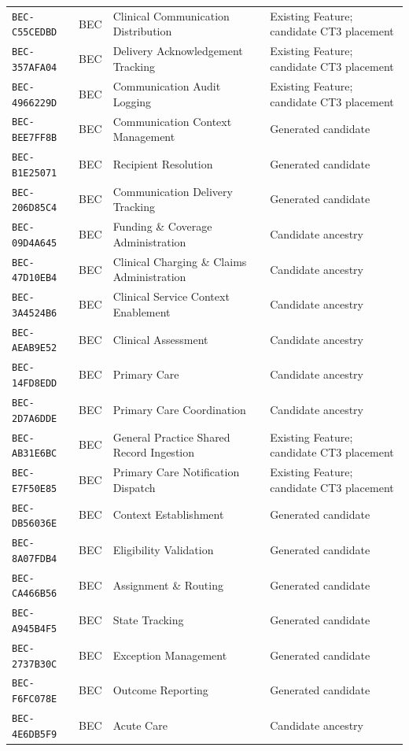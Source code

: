 \documentclass[11pt,a4paper,openany]{book}
\begin{document}
\begin{longtable}{@{}p{.19\linewidth}p{.12\linewidth}p{.39\linewidth}p{.24\linewidth}@{}}
\texttt{BEC-C55CEDBD} & BEC & Clinical Communication Distribution & Existing Feature; candidate CT3 placement \\
\texttt{BEC-357AFA04} & BEC & Delivery Acknowledgement Tracking & Existing Feature; candidate CT3 placement \\
\texttt{BEC-4966229D} & BEC & Communication Audit Logging & Existing Feature; candidate CT3 placement \\
\texttt{BEC-BEE7FF8B} & BEC & Communication Context Management & Generated candidate \\
\texttt{BEC-B1E25071} & BEC & Recipient Resolution & Generated candidate \\
\texttt{BEC-206D85C4} & BEC & Communication Delivery Tracking & Generated candidate \\
\texttt{BEC-09D4A645} & BEC & Funding \& Coverage Administration & Candidate ancestry \\
\texttt{BEC-47D10EB4} & BEC & Clinical Charging \& Claims Administration & Candidate ancestry \\
\texttt{BEC-3A4524B6} & BEC & Clinical Service Context Enablement & Candidate ancestry \\
\texttt{BEC-AEAB9E52} & BEC & Clinical Assessment & Candidate ancestry \\
\texttt{BEC-14FD8EDD} & BEC & Primary Care & Candidate ancestry \\
\texttt{BEC-2D7A6DDE} & BEC & Primary Care Coordination & Candidate ancestry \\
\texttt{BEC-AB31E6BC} & BEC & General Practice Shared Record Ingestion & Existing Feature; candidate CT3 placement \\
\texttt{BEC-E7F50E85} & BEC & Primary Care Notification Dispatch & Existing Feature; candidate CT3 placement \\
\texttt{BEC-DB56036E} & BEC & Context Establishment & Generated candidate \\
\texttt{BEC-8A07FDB4} & BEC & Eligibility Validation & Generated candidate \\
\texttt{BEC-CA466B56} & BEC & Assignment \& Routing & Generated candidate \\
\texttt{BEC-A945B4F5} & BEC & State Tracking & Generated candidate \\
\texttt{BEC-2737B30C} & BEC & Exception Management & Generated candidate \\
\texttt{BEC-F6FC078E} & BEC & Outcome Reporting & Generated candidate \\
\texttt{BEC-4E6DB5F9} & BEC & Acute Care & Candidate ancestry \\

\end{longtable}
\end{document}
